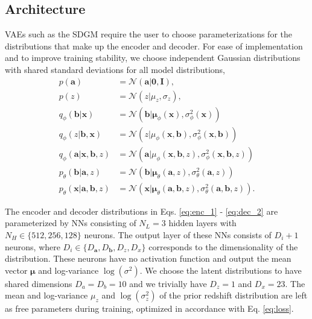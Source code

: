 
\subsection{Architecture}
\label{subsec:architecture}

VAEs such as the SDGM require the user to choose parameterizations for the distributions that make up the encoder and decoder. For ease of implementation and to improve training stability, we choose independent Gaussian distributions with shared standard deviations for all model distributions,
\begin{align}
    p(\mathbf{a}) &= \mathcal{N}(
        \mathbf{\mathbf{a}|\mathbf{0}, \mathbf{I}}
    ), \\
    p(z) &= \mathcal{N}(
        z|\mu_z, \sigma_z
    ), \\
    q_\phi(\mathbf{b}|\mathbf{x}) &= \mathcal{N}(
        \mathbf{b}|\boldsymbol{\mu}_\phi(\mathbf{x}), \sigma^2_\phi(\mathbf{x})
    ) \label{eq:enc_1} \\
    q_\phi(z|\mathbf{b},\mathbf{x}) &= \mathcal{N}(
        z|\mu_\phi(\mathbf{x}, \mathbf{b}), \sigma^2_\phi(\mathbf{x}, \mathbf{b})
    )\\
    q_\phi(\mathbf{a} | \mathbf{x}, \mathbf{b}, z) &= \mathcal{N}(
        \mathbf{a}|\mu_\phi(\mathbf{x}, \mathbf{b}, z), \sigma^2_\phi(\mathbf{x}, \mathbf{b}, z)
    )\\
    p_\theta(\mathbf{b}|\mathbf{a}, z) &= \mathcal{N}(
        \mathbf{b}|\boldsymbol{\mu}_\theta(\mathbf{a}, z), \sigma^2_\theta(\mathbf{a}, z)
    ) \\
    p_\theta(\mathbf{x}|\mathbf{a}, \mathbf{b}, z) &= \mathcal{N}(
        \mathbf{x}|\boldsymbol{\mu}_\theta(\mathbf{a}, \mathbf{b}, z), \sigma^2_\theta(\mathbf{a}, \mathbf{b}, z)
    ). \label{eq:dec_2}
\end{align}

The encoder and decoder distributions in Eqs. \ref{eq:enc_1} - \ref{eq:dec_2} are parameterized by NNs consisting of $N_L=3$ hidden layers with $N_H\in \{512, 256, 128\}$ neurons. The output layer of these NNs consists of $D_i+1$ neurons, where $D_i \in \{D_\mathbf{a}, D_\mathbf{b}, D_z, D_x\}$ corresponds to the dimensionality of the distribution. These neurons have no activation function and output the mean vector $\boldsymbol{\mu}$ and log-variance $\log(\sigma^2)$. We choose the latent distributions to have shared dimensions $D_a = D_b = 10$ and we trivially have $D_z=1$ and $D_x=23$. The mean and log-variance $\mu_z$ and $\log(\sigma_z^2)$ of the prior redshift distribution are left as free parameters during training, optimized in accordance with Eq. \ref{eq:loss}. 

